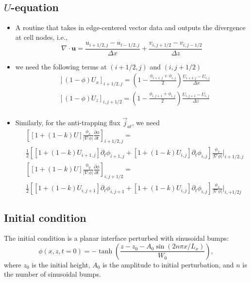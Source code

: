 \documentclass[a4paper,12pt]{article}
\newcommand{\B}[1]{\mathbf{#1}}
\renewcommand{\div}[1]{\nabla_{#1} \cdot}
\newcommand{\grad}[1]{\nabla_{#1}}
\begin{document}
\subsection{$U$-equation}
\begin{itemize}
\item A routine that takes in edge-centered vector data and outputs the divergence at cell nodes, i.e.,
\begin{equation}
\div{} \B{u} = \frac{u_{i+1/2,j} - u_{i-1/2,j}}{\Delta x} +  \frac{v_{i, j+1/2} - v_{i,j-1/2}}{\Delta z}
\end{equation}

\item we need the following terms at $(i+1/2,j)$ and $(i,j+1/2)$
\begin{align}
& [(1-\phi) U_x]_{i+1/2,j} = \left( 1- \frac{\phi_{i+1,j} + \phi_{i,j}}{2} \right) \frac{U_{i+1,j}-U_{i,j}}{\Delta x}\\
& [(1-\phi) U_z]_{i,j+1/2} = \left( 1- \frac{\phi_{i,j+1} + \phi_{i,j}}{2} \right) \frac{U_{i,j+1}-U_{i,j}}{\Delta z}\\
\end{align}

\item Similarly, for the anti-trapping flux $\vec{j}_{at}$, we need
\begin{align}
& \left[ [1+(1-k)U]  \frac{\phi_x}{ |\grad{} \phi | } \frac{\partial \phi}{\partial t}  \right]_{i+1/2,j} = \nonumber \\
&  \frac{1}{2}\left[[1+(1-k)U_{i+1,j}]\partial_t\phi_{i+1,j}+[1+(1-k)U_{i,j}]\partial_t\phi_{i,j}\right]  \frac{\phi_x}{ |\grad{} \phi | }\bigg|_{i+1/2,j}  \\
& \left[ [1+(1-k)U]  \frac{\phi_y}{ |\grad{} \phi | } \frac{\partial \phi}{\partial t}  \right]_{i,j+1/2} = \nonumber \\ 
& \frac{1}{2}\left[[1+(1-k)U_{i,j+1}]\partial_t\phi_{i,j+1}+[1+(1-k)U_{i,j}]\partial_t\phi_{i,j}\right]  \frac{\phi_x}{ |\grad{} \phi | }\bigg|_{i,+1/2j}  
\end{align}
\end{itemize}



\subsection{Initial condition}
The initial condition is a planar interface perturbed with sinusoidal bumps:
\begin{equation}
\phi(x,z,t=0) = - \tanh \left( \frac{z - z_0 - A_0\sin(2n\pi x /L_x  ) }{W_0}  \right),
\end{equation}
where $z_0$ is the initial height, $A_0$ is the amplitude to initial perturbation, and $n$ is the number of  sinusoidal bumps.  
\end{document}
